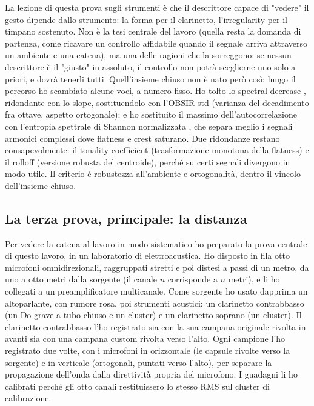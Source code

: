 \documentclass{article}
\begin{document}
La lezione di questa prova sugli strumenti è che il descrittore capace di "vedere" il gesto dipende dallo strumento: la forma per il clarinetto, l'irregularity per il timpano sostenuto. Non è la tesi centrale del lavoro (quella resta la domanda di partenza, come ricavare un controllo affidabile quando il segnale arriva attraverso un ambiente e una catena), ma una delle ragioni che la sorreggono: se nessun descrittore è il "giusto" in assoluto, il controllo non potrà sceglierne uno solo a priori, e dovrà tenerli tutti.
Quell'insieme chiuso non è nato però così: lungo il percorso ho scambiato alcune voci, a numero fisso. Ho tolto lo spectral decrease \cite{peeters2004largeset}, ridondante con lo slope, sostituendolo con l'OBSIR-std \cite{essid2006musical} (varianza del decadimento fra ottave, aspetto ortogonale); e ho sostituito il massimo dell'autocorrelazione con l'entropia spettrale di Shannon normalizzata \cite{shen1998robust,misra2004spectral}, che separa meglio i segnali armonici complessi dove flatness e crest saturano. Due ridondanze restano consapevolmente: il tonality coefficient (trasformazione monotona della flatness) e il rolloff (versione robusta del centroide), perché su certi segnali divergono in modo utile. Il criterio è robustezza all'ambiente e ortogonalità, dentro il vincolo dell'insieme chiuso.

\subsection{La terza prova, principale: la distanza}\label{sec:leap}

Per vedere la catena al lavoro in modo sistematico ho preparato la prova centrale di questo lavoro, in un laboratorio di elettroacustica. Ho disposto in fila otto microfoni omnidirezionali, raggruppati stretti e poi distesi a passi di un metro, da uno a otto metri dalla sorgente (il canale $n$ corrisponde a $n$ metri), e li ho collegati a un preamplificatore multicanale. Come sorgente ho usato dapprima un altoparlante, con rumore rosa, poi strumenti acustici: un clarinetto contrabbasso (un Do grave a tubo chiuso e un cluster) e un clarinetto soprano (un cluster). Il clarinetto contrabbasso l'ho registrato sia con la sua campana originale rivolta in avanti sia con una campana custom rivolta verso l'alto. Ogni campione l'ho registrato due volte, con i microfoni in orizzontale (le capsule rivolte verso la sorgente) e in verticale (ortogonali, puntati verso l'alto), per separare la propagazione dell'onda dalla direttività propria del microfono. I guadagni li ho calibrati perché gli otto canali restituissero lo stesso RMS sul cluster di calibrazione. %
\end{document}
